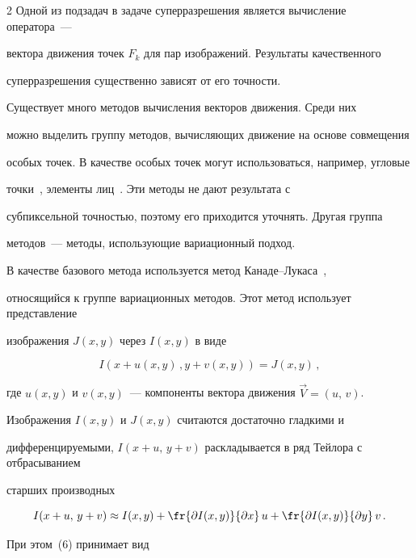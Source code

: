\begin{multicols}{2}
     Одной из подзадач в задаче суперразрешения является вычисление оператора~---


вектора движения точек $F_k$ для пар изображений. Результаты качественного


суперразрешения существенно зависят от его точности.





     Существует много методов вычисления векторов движения. Среди них


можно выделить группу методов, вычисляющих движение на основе совмещения


особых точек. В качестве особых точек могут использоваться, например, угловые


точки~\cite{20nas}, элементы лиц~\cite{21nas}. Эти методы не дают результата с


субпиксельной точностью, поэтому его приходится уточнять. Другая группа


     методов~--- методы, использующие вариационный подход.





     В качестве базового метода используется метод Канаде--Лукаса~\cite{22nas},


относящийся к группе вариационных методов. Этот метод использует пред\-став\-ле\-ние


изображения $J(x,y)$ через $I(x,y)$ в виде


     \begin{equation}


     I(x+u(x,y)\,,y+v(x,y)) = J(x,y)\,,


     \label{e6nas}


     \end{equation}


где $u(x,y)$ и $v(x,y)$~--- компоненты вектора движения $\vec{V} =(u,\,v)$.


Изображения $I(x,y)$ и $J(x,y)$ считаются достаточно гладкими и


диф\-фе\-рен\-ци\-ру\-емы\-ми, $I(x+u,\,y+v)$ раскладывается в ряд Тейлора с отбрасыванием


старших производных


$$


I(x+u,\,y+v)\approx I(x,y)+\fr{\partial I(x,y)}{\partial x}\,u+\fr{\partial I(x,y)}{\partial


y}\,v\,.


$$


При этом~(6) принимает вид



\end{multicols}
